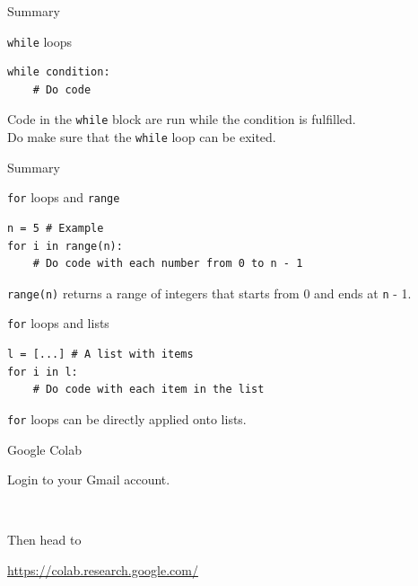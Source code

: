 \documentclass[dvipsnames, svgnames, x11names, handout]{beamer}
\begin{document}
\begin{frame}[fragile]{Summary}
\begin{block}{\texttt{while} loops}
\begin{verbatim}
while condition:
    # Do code
\end{verbatim}
Code in the \texttt{while} block are run while the condition is fulfilled.\\
Do make sure that the \texttt{while} loop can be exited.
\end{block}
\end{frame}

\begin{frame}[fragile]{Summary}
\begin{block}{\texttt{for} loops and \texttt{range}}
\begin{verbatim}
n = 5 # Example
for i in range(n):
    # Do code with each number from 0 to n - 1
\end{verbatim}
\texttt{range(n)} returns a range of integers that starts from 0 and ends at \texttt{n} - 1.
\end{block}

\begin{block}{\texttt{for} loops and lists}
\begin{verbatim}
l = [...] # A list with items
for i in l:
    # Do code with each item in the list
\end{verbatim}
\texttt{for} loops can be directly applied onto lists.
\end{block}
\end{frame}

\begin{frame}[fragile]{Google Colab}
    \begin{center}
        Login to your Gmail account.

        \

        Then head to

        \href{https://colab.research.google.com/}{https://colab.research.google.com/}
    \end{center}
\end{frame}
\end{document}
